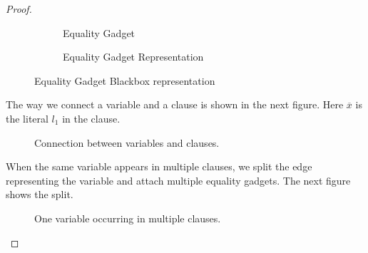 \begin{proof}
\begin{figure}[h!]
\begin{subfigure}[b]{0.3\textwidth}
	\caption{Equality Gadget}
\end{subfigure}
\begin{subfigure}[b]{0.3\textwidth}
\centering
{}	
	\caption{Equality Gadget Representation}
\end{subfigure}
\caption{Equality Gadget Blackbox representation}
\label{fig:EqBlackbox}
\end{figure}

The way we connect a variable and a clause is shown in the next figure. Here $\overline{x}$ is the literal $l_1$ in the clause. 

\begin{figure}[h!]
\centering

\begin{subfigure}[b]{0.3\textwidth}
\centering
{}	
\end{subfigure}
\caption{Connection between variables and clauses.}
\label{VarClauseConnection}
\end{figure}

When the same variable appears in multiple clauses, we split the edge representing the variable and attach multiple equality gadgets. The next figure shows the split.

\begin{figure}[ht!]
\begin{subfigure}[b]{0.3\textwidth}
	\label{fig:subfigure1}
\end{subfigure}
	\caption{One variable occurring in multiple clauses.}
\end{figure}


\end{proof}
